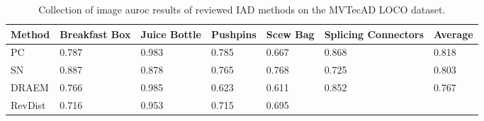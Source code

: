 \begin{table}[htbp]
    \tiny
    \centering
    \begin{tabularx}{\textwidth}{|X|X|X|X|X|X|X|}%
        \hline
        \textbf{Method} & \textbf{Breakfast Box} & \textbf{Juice Bottle} & \textbf{Pushpins} & \textbf{Scew Bag} & \textbf{Splicing Connectors} & \textbf{Average} \\
        \hline
        PC \cite{patchCore2022} & 0.787 & 0.983 & 0.785 & 0.667 & 0.868 & 0.818 \\
        \hline
        SN \cite{liu2023simplenet} & 0.887 & 0.878 & 0.765 & 0.768 & 0.725 & 0.803 \\
        \hline
        DRAEM \cite{Zavrtanik_2021DRAEM} & 0.766 & 0.985 & 0.623 & 0.611 & 0.852 & 0.767 \\
        \hline
        RevDist \cite{revdist2023} & 0.716 & 0.953 & 0.715 & 0.695 &  &  \\
        \hline
    \end{tabularx}
    \caption{Collection of image auroc results of reviewed IAD methods on the MVTecAD LOCO \cite{LOCODentsAndScratchesBergmann2022} dataset.}
    \label{tab:imageaurocloco}
\end{table}





